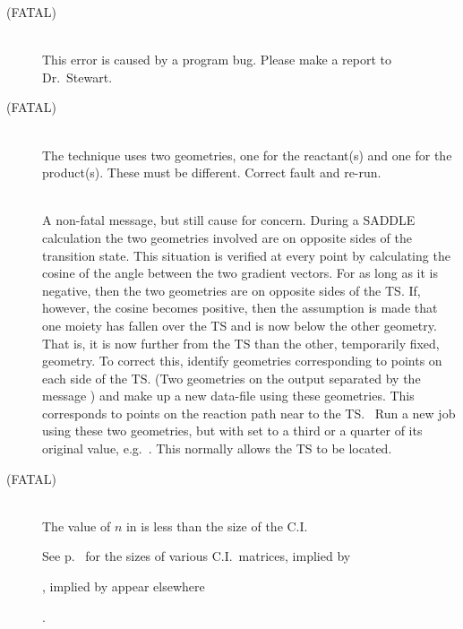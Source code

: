 \begin{description}
\item[ (FATAL)]~\\
This error is caused by a program bug.  Please make a report to Dr.~Stewart.

\item[ (FATAL)]~\\
The  technique uses two geometries, one for the reactant(s) and
one for the product(s).  These must be different.  Correct fault and re-run.

\item[]~\\
A non-fatal message, but still cause for concern.  During a  SADDLE
calculation  the  two  geometries  involved are on opposite sides of the
transition  state.   This  situation  is  verified  at  every  point  by
calculating  the  cosine  of the angle between the two gradient vectors. For as
long as it is negative, then the two geometries are  on  opposite sides  of 
the   TS.  If, however, the cosine becomes positive, then the assumption is
made that one moiety has fallen over the  TS  and  is  now below  the other
geometry.  That is, it is now further from the  TS than the other, temporarily 
fixed,  geometry.   To  correct  this,  identify geometries  corresponding  to 
points  on  each  side  of the  TS.  (Two geometries on the output separated
by  the  message   )  and make  up  a  new  data-file
using these geometries.  This corresponds to points on the reaction path near
to the  TS. \ Run a new job using  these two geometries, but with 
 set to  a third or a quarter of its original value, e.g.\
.  This normally allows the  TS to be located.


\item[ (FATAL)]~\\
The value of $n$ in \comp{ROOT=$n$} is less than the size of the C.I. 

\begin{latexonly}
See p.~\pageref{setmic} for the sizes of various C.I.\ matrices, implied by
\end{latexonly}
\begin{htmlonly}
, implied by 
\comp{C.I.=$m$} appear elsewhere
\end{htmlonly}.


\end{description}
